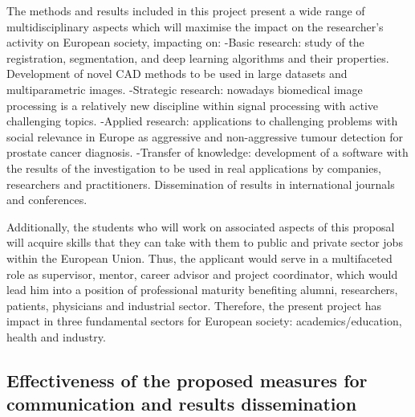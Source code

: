 The methods and results included in this project present a wide range of multidisciplinary aspects which will maximise the impact on the researcher's activity on European society, impacting on:
-Basic research: study of the registration, segmentation, and deep learning  algorithms and their properties.  Development of novel CAD methods to be used in large datasets and multiparametric images.
-Strategic research: nowadays biomedical image processing is a relatively new discipline within signal processing with active challenging topics.
-Applied research: applications to challenging problems with social relevance in Europe  as aggressive and non-aggressive tumour detection for prostate cancer diagnosis.
-Transfer of knowledge: development of a software with the results of the investigation to be used in real applications by companies, researchers and practitioners.  Dissemination of results in international journals and conferences.

Additionally, the students who will work on associated aspects of this proposal will acquire skills that they can take with them to public and private sector jobs within the European Union. Thus, the applicant would serve in a multifaceted role as supervisor, mentor, career advisor and project coordinator, which would lead him into a position of professional maturity benefiting alumni, researchers, patients, physicians and industrial sector. Therefore, the present project has impact in three fundamental sectors for European society: academics/education, health and industry.

\subsection{Effectiveness of the proposed measures for communication and results dissemination}

